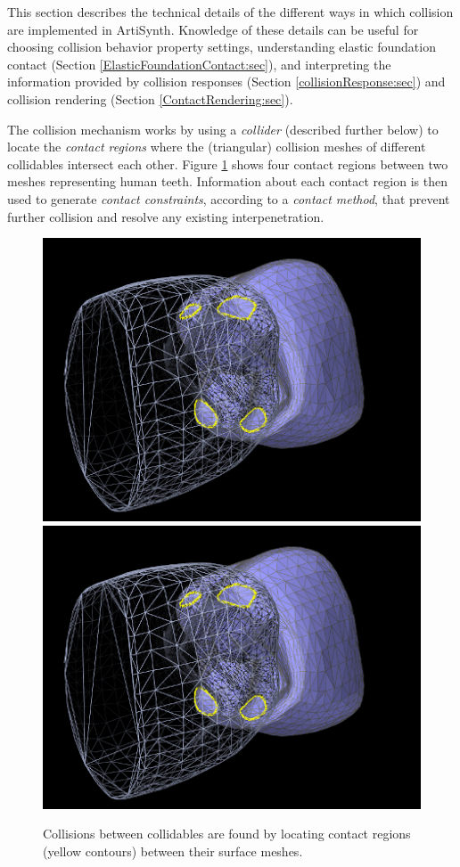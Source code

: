 This section describes the technical details of the different ways in
which collision are implemented in ArtiSynth. Knowledge of these
details can be useful for choosing collision behavior property
settings, understanding elastic foundation contact
(Section \ref{ElasticFoundationContact:sec}), and interpreting the
information provided by collision responses (Section
\ref{collisionResponse:sec}) and collision rendering (Section
\ref{ContactRendering:sec}).

The collision mechanism works by using a {\it collider} (described
further below) to locate the {\it contact regions} where the
(triangular) collision meshes of different collidables intersect
each other. Figure \ref{IntersectionRegions:fig} shows four
contact regions between two meshes representing human teeth.
Information about each contact region is then used to generate
{\it contact constraints}, according to a {\it contact method}, that
prevent further collision and resolve any existing interpenetration.

\begin{figure}[h]
\begin{center}
\iflatexml
 \includegraphics[]{images/molarIntersection}
\else
 \includegraphics[width=4.5in]{images/molarIntersection}
\fi
\end{center}
\caption{Collisions between collidables are found by locating
contact regions (yellow contours) between their surface meshes.}
\label{IntersectionRegions:fig}
\end{figure}

